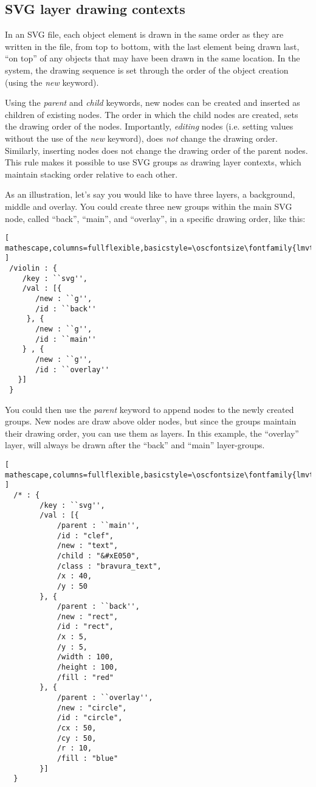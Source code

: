 \subsection{SVG layer drawing contexts}\label{sec:contexts}
In an SVG file, each object element is drawn in the same order as they are written in the file, from top to bottom, with the last element being drawn last, ``on top'' of any objects that may have been drawn in the same location.
In the \drawsocket system, the drawing sequence is set through the order of the object creation (using the \textit{new} keyword).

Using the \textit{parent} and \textit{child} keywords, new nodes can be created and inserted as children of existing nodes.
The order in which the child nodes are created, sets the drawing order of the nodes.
Importantly, \textit{editing} nodes (i.e. setting values without the use of the \textit{new} keyword), does \textit{not} change the drawing order.
Similarly, inserting nodes does not change the drawing order of the parent nodes.
This rule makes it possible to use SVG groups as drawing layer contexts, which maintain stacking order relative to each other.

As an illustration, let's say you would like to have three layers, a background, middle and overlay. 
You could create three new groups within the main SVG node, called ``back'', ``main'', and ``overlay'', in a specific drawing order, like this:

\begin{lstlisting}[ mathescape,columns=fullflexible,basicstyle=\oscfontsize\fontfamily{lmvtt}\selectfont ]
 /violin : {
    /key : ``svg'',
    /val : [{
       /new : ``g'',
       /id : ``back''
     }, {
       /new : ``g'',
       /id : ``main''
    } , {
       /new : ``g'',
       /id : ``overlay''
   }]
 }
\end{lstlisting}

You could then use the \textit{parent} keyword to append nodes to the newly created groups. New nodes are draw above older nodes, but since the groups maintain their drawing order, you can use them as layers. In this example, the ``overlay'' layer, will always be drawn after the ``back'' and ``main'' layer-groups.

\begin{minipage}{\linewidth}
\begin{lstlisting}[ mathescape,columns=fullflexible,basicstyle=\oscfontsize\fontfamily{lmvtt}\selectfont ]
  /* : {
        /key : ``svg'',
        /val : [{
            /parent : ``main'',
            /id : "clef",
            /new : "text",
            /child : "&#xE050",
            /class : "bravura_text",
            /x : 40,
            /y : 50
        }, {
            /parent : ``back'',
            /new : "rect",
            /id : "rect",
            /x : 5,
            /y : 5,
            /width : 100,
            /height : 100,
            /fill : "red"
        }, {
            /parent : ``overlay'',
            /new : "circle",
            /id : "circle",
            /cx : 50,
            /cy : 50,
            /r : 10,
            /fill : "blue"
        }]
  } 
\end{lstlisting}
\end{minipage}

